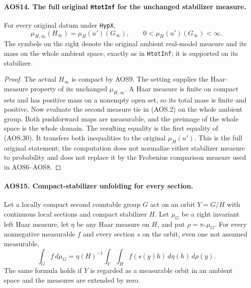 \documentclass[11pt,a4paper]{article}
\numberwithin{equation}{section}
\theoremstyle{remark}\newtheorem{remark}[theorem]{Remark}
\begin{document}
\paragraph{AOS14. The full original \texttt{Htot\allowbreak Inf} for the unchanged stabilizer measure.}
\label{claim:AOS14}
For every original datum under \texttt{Hyp\allowbreak X},
\[
         \mu_{H,\infty}(H_\infty)=\mu_H(u')(G_\infty),
             \qquad 0<\mu_H(u')(G_\infty)<\infty.
 \tag{AOS.30}
\]
The symbols on the right denote the original ambient real-model
measure and its mass on the whole ambient space, exactly as in
\texttt{Htot\allowbreak Inf}; it is supported on its stabilizer.

\begin{proof}
The actual $H_\infty$ is compact by AOS9.  The setting supplies
the Haar-measure property of its unchanged $\mu_{H,\infty}$.
A Haar measure is finite on compact sets and has positive mass
on a nonempty open set, so its total mass is finite and positive.
Now evaluate the second measure tie in (AOS.2) on the whole ambient
group.  Both pushforward maps are measurable, and the preimage of
the whole space is the whole domain.  The resulting equality is
the first equality of (AOS.30).  It transfers both inequalities to
the original $\mu_H(u')$.  This is the full original statement;
the computation does not normalize either stabilizer measure to
probability and does not replace it by the Frobenius comparison
measure used in AOS6--AOS8.
\end{proof}

\paragraph{AOS15. Compact-stabilizer unfolding for every section.}
\label{claim:AOS15}
Let a locally compact second countable group $G$ act on an orbit
$Y=G/H$ with continuous local sections and compact stabilizer $H$.
Let $\mu_G$ be a right invariant left Haar measure, let $\eta$ be
any Haar measure on $H$, and put $\rho=\pi_*\mu_G$.
For every nonnegative measurable $f$ and every section $s$ on the
orbit, even one not assumed measurable,
\[
       \int_G f\,d\mu_G
        =\eta(H)^{-1}
           \int_Y\int_H f(s(y)h)\,d\eta(h)\,d\rho(y).
 \tag{AOS.31}
\]
The same formula holds if $Y$ is regarded as a measurable orbit in
an ambient space and the measures are extended by zero.
\end{document}
